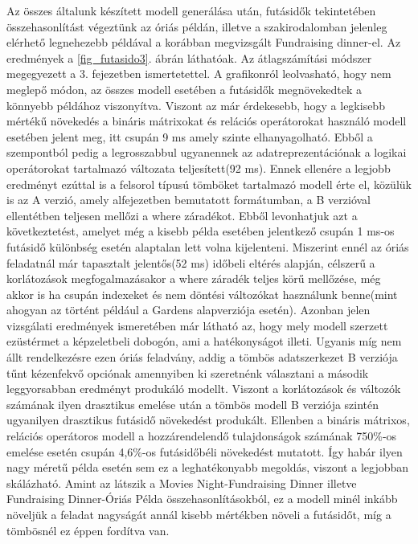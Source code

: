 \documentclass[12pt,a4paper,twoside, openright]{report}
\begin{document}
    Az összes általunk készített modell generálása után, futásidők tekintetében összehasonlítást végeztünk az óriás példán, illetve a szakirodalomban jelenleg elérhető legnehezebb példával a korábban megvizsgált Fundraising dinner-el.
    Az eredmények a \ref{fig_futasido3}. ábrán láthatóak.
    Az átlagszámítási módszer megegyezett a  3. fejezetben ismertetettel.
    A grafikonról leolvasható, hogy nem meglepő módon, az összes modell  esetében a futásidők megnövekedtek a könnyebb példához viszonyítva.
    Viszont az már érdekesebb, hogy a legkisebb mértékű növekedés a bináris mátrixokat és relációs operátorokat használó modell esetében jelent meg, itt csupán 9 ms amely szinte elhanyagolható.
    Ebből a szempontból pedig a legrosszabbul ugyanennek az adatreprezentációnak a logikai operátorokat tartalmazó változata teljesített(92 ms).
    Ennek ellenére a legjobb eredményt ezúttal is a felsorol típusú tömböket tartalmazó modell érte el, közülük is az A verzió, amely  alfejezetben bemutatott formátumban, a B verzióval ellentétben teljesen mellőzi a where záradékot.
    Ebből levonhatjuk azt a következtetést, amelyet még a kisebb példa esetében jelentkező csupán 1 ms-os futásidő különbség esetén alaptalan lett volna kijelenteni.
    Miszerint ennél az óriás feladatnál már tapasztalt jelentős(52 ms) időbeli eltérés alapján, célszerű a korlátozások megfogalmazásakor a where záradék teljes körű mellőzése, még akkor is ha csupán indexeket és nem döntési változókat használunk benne(mint ahogyan az történt például a Gardens alapverziója esetén).
    Azonban jelen vizsgálati eredmények ismeretében már látható az, hogy mely modell szerzett ezüstérmet a képzeletbeli dobogón, ami a hatékonyságot illeti.
    Ugyanis míg nem állt rendelkezésre ezen óriás feladvány, addig a tömbös adatszerkezet B verziója tűnt kézenfekvő opciónak amennyiben ki szeretnénk választani a második leggyorsabban eredményt produkáló modellt.
    Viszont a korlátozások és változók számának ilyen drasztikus emelése után a tömbös modell B verziója szintén ugyanilyen drasztikus futásidő növekedést produkált.
    Ellenben a bináris mátrixos, relációs operátoros modell a hozzárendelendő tulajdonságok számának 750\%-os emelése esetén csupán 4,6\%-os futásidőbéli növekedést mutatott.
    Így habár ilyen nagy méretű példa esetén sem ez a leghatékonyabb megoldás, viszont a legjobban skálázható.
    Amint az látszik a Movies Night-Fundraising Dinner illetve Fundraising Dinner-Óriás Példa összehasonlításokból, ez a modell minél inkább növeljük a feladat nagyságát annál kisebb mértékben növeli a futásidőt, míg a tömbösnél ez éppen fordítva van.
    
\end{document}
